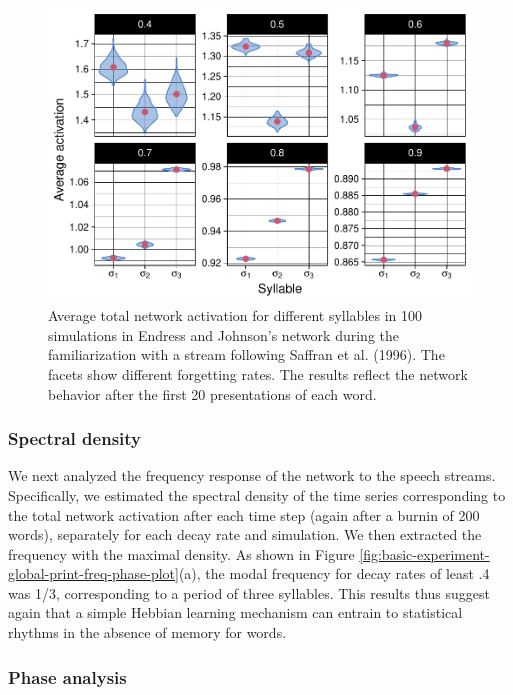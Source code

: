 \documentclass[
]{article}
\begin{document}
\begin{figure}
\includegraphics[width=1\linewidth]{tp_model_entrainment_files/figure-latex/basic-experiment-global-print-act-in-words-plot-1} \caption{Average total network activation for different syllables in 100 simulations in Endress and Johnson's network during the familiarization with a stream following Saffran et al. (1996). The facets show different forgetting rates. The results reflect the network behavior after the first 20 presentations of each word. }\label{fig:basic-experiment-global-print-act-in-words-plot}
\end{figure}

\hypertarget{spectral-density}{%
\subsubsection{Spectral density}\label{spectral-density}}

We next analyzed the frequency response of the network to the speech
streams. Specifically, we estimated the spectral density of the time
series corresponding to the total network activation after each time
step (again after a burnin of 200 words), separately for each decay rate
and simulation. We then extracted the frequency with the maximal
density. As shown in Figure
\ref{fig:basic-experiment-global-print-freq-phase-plot}(a), the modal
frequency for decay rates of least .4 was 1/3, corresponding to a period
of three syllables. This results thus suggest again that a simple
Hebbian learning mechanism can entrain to statistical rhythms in the
absence of memory for words.

\hypertarget{phase-analysis}{%
\subsubsection{Phase analysis}\label{phase-analysis}}
\end{document}
